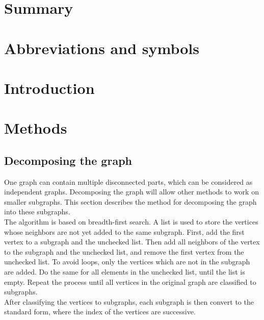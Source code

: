 \documentclass[a4paper]{report}
\begin{document}
	

	\chapter*{Summary}
	
	\tableofcontents
	
	\chapter*{Abbreviations and symbols}
	
	\chapter{Introduction}

	
	\chapter{Methods}
	
		\section{Decomposing the graph}
		One graph can contain multiple disconnected parts, which can be considered as independent graphs. Decomposing the graph will allow other methods to work on smaller subgraphs. This section describes the method for decomposing the graph into these subgraphs.\\
		The algorithm is based on breadth-first search. A list is used to store the vertices whose neighbors are not yet added to the same subgraph. First, add the first vertex to a subgraph and the unchecked list. Then add all neighbors of the vertex to the subgraph and the unchecked list, and remove the first vertex from the unchecked list. To avoid loops, only the vertices which are not in the subgraph are added. Do the same for all elements in the unchecked list, until the list is empty. Repeat the process until all vertices in the original graph are classified to subgraphs.\\
		After classifying the vertices to subgraphs, each subgraph is then convert to the standard form, where the index of the vertices are successive.
		
		
\end{document}
